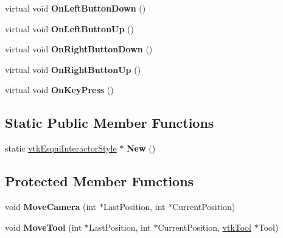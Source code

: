 \begin{DoxyCompactItemize}
\item 
\hypertarget{classvtkEsquiInteractorStyle_a880fef8970dffb6dcd5f574666af08a0}{
virtual void {\bfseries OnLeftButtonDown} ()}
\label{classvtkEsquiInteractorStyle_a880fef8970dffb6dcd5f574666af08a0}

\item 
\hypertarget{classvtkEsquiInteractorStyle_afbbc11668e7871344b584340da06201f}{
virtual void {\bfseries OnLeftButtonUp} ()}
\label{classvtkEsquiInteractorStyle_afbbc11668e7871344b584340da06201f}

\item 
\hypertarget{classvtkEsquiInteractorStyle_a1447d555e8e03c2c4203c320c2479461}{
virtual void {\bfseries OnRightButtonDown} ()}
\label{classvtkEsquiInteractorStyle_a1447d555e8e03c2c4203c320c2479461}

\item 
\hypertarget{classvtkEsquiInteractorStyle_ab74a115c229d98be52a6e433246ec4cc}{
virtual void {\bfseries OnRightButtonUp} ()}
\label{classvtkEsquiInteractorStyle_ab74a115c229d98be52a6e433246ec4cc}

\item 
\hypertarget{classvtkEsquiInteractorStyle_a1c96c3789862ce74f970e6556e14f6af}{
virtual void {\bfseries OnKeyPress} ()}
\label{classvtkEsquiInteractorStyle_a1c96c3789862ce74f970e6556e14f6af}

\end{DoxyCompactItemize}
\subsection*{Static Public Member Functions}
\begin{DoxyCompactItemize}
\item 
\hypertarget{classvtkEsquiInteractorStyle_a4b3104ad86e728c30f659c615fc80299}{
static \hyperlink{classvtkEsquiInteractorStyle}{vtkEsquiInteractorStyle} $\ast$ {\bfseries New} ()}
\label{classvtkEsquiInteractorStyle_a4b3104ad86e728c30f659c615fc80299}

\end{DoxyCompactItemize}
\subsection*{Protected Member Functions}
\begin{DoxyCompactItemize}
\item 
\hypertarget{classvtkEsquiInteractorStyle_a4d48120c71c29bbc585dc1b31cf23f57}{
void {\bfseries MoveCamera} (int $\ast$LastPosition, int $\ast$CurrentPosition)}
\label{classvtkEsquiInteractorStyle_a4d48120c71c29bbc585dc1b31cf23f57}

\item 
\hypertarget{classvtkEsquiInteractorStyle_a6ddf20ee00e5d3b4c1d09c25edadf387}{
void {\bfseries MoveTool} (int $\ast$LastPosition, int $\ast$CurrentPosition, \hyperlink{classvtkTool}{vtkTool} $\ast$Tool)}
\label{classvtkEsquiInteractorStyle_a6ddf20ee00e5d3b4c1d09c25edadf387}

\end{DoxyCompactItemize}
